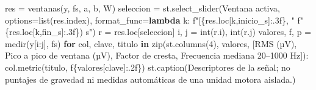\documentclass[
  spanish,
  10.5pt,
  a4paper,
  DIV=11,
  numbers=noendperiod]{scrartcl}
\newenvironment{Shaded}{\begin{snugshade}}{\end{snugshade}}
\newcommand{\BuiltInTok}[1]{\textcolor[rgb]{0.00,0.23,0.31}{#1}}
\newcommand{\ControlFlowTok}[1]{\textcolor[rgb]{0.00,0.23,0.31}{\textbf{#1}}}
\newcommand{\DecValTok}[1]{\textcolor[rgb]{0.68,0.00,0.00}{#1}}
\newcommand{\KeywordTok}[1]{\textcolor[rgb]{0.00,0.23,0.31}{\textbf{#1}}}
\newcommand{\NormalTok}[1]{\textcolor[rgb]{0.00,0.23,0.31}{#1}}
\newcommand{\OperatorTok}[1]{\textcolor[rgb]{0.37,0.37,0.37}{#1}}
\newcommand{\SpecialCharTok}[1]{\textcolor[rgb]{0.37,0.37,0.37}{#1}}
\newcommand{\SpecialStringTok}[1]{\textcolor[rgb]{0.13,0.47,0.30}{#1}}
\newcommand{\StringTok}[1]{\textcolor[rgb]{0.13,0.47,0.30}{#1}}
\begin{document}
\begin{Shaded}
\begin{Highlighting}[]
\NormalTok{res }\OperatorTok{=}\NormalTok{ ventanas(y, fs, a, b, W)}
\NormalTok{seleccion }\OperatorTok{=}\NormalTok{ st.select\_slider(}\StringTok{\textquotesingle{}Ventana activa\textquotesingle{}}\NormalTok{, options}\OperatorTok{=}\BuiltInTok{list}\NormalTok{(res.index),}
\NormalTok{    format\_func}\OperatorTok{=}\KeywordTok{lambda}\NormalTok{ k: }\SpecialStringTok{f"[}\SpecialCharTok{\{}\NormalTok{res}\SpecialCharTok{.}\NormalTok{loc[k,}\StringTok{\textquotesingle{}inicio\_s\textquotesingle{}}\NormalTok{]}\SpecialCharTok{:.3f\}}\SpecialStringTok{, "}
                         \SpecialStringTok{f"}\SpecialCharTok{\{}\NormalTok{res}\SpecialCharTok{.}\NormalTok{loc[k,}\StringTok{\textquotesingle{}fin\_s\textquotesingle{}}\NormalTok{]}\SpecialCharTok{:.3f\}}\SpecialStringTok{) s"}\NormalTok{)}
\NormalTok{r }\OperatorTok{=}\NormalTok{ res.loc[seleccion]}
\NormalTok{i, j }\OperatorTok{=} \BuiltInTok{int}\NormalTok{(r.i), }\BuiltInTok{int}\NormalTok{(r.j)}
\NormalTok{valores, f, p }\OperatorTok{=}\NormalTok{ medir(y[i:j], fs)}
\ControlFlowTok{for}\NormalTok{ col, clave, titulo }\KeywordTok{in} \BuiltInTok{zip}\NormalTok{(st.columns(}\DecValTok{4}\NormalTok{), valores,}
\NormalTok{    [}\StringTok{\textquotesingle{}RMS (µV)\textquotesingle{}}\NormalTok{, }\StringTok{\textquotesingle{}Pico a pico de ventana (µV)\textquotesingle{}}\NormalTok{,}
     \StringTok{\textquotesingle{}Factor de cresta\textquotesingle{}}\NormalTok{, }\StringTok{\textquotesingle{}Frecuencia mediana 20–1000 Hz\textquotesingle{}}\NormalTok{]):}
\NormalTok{    col.metric(titulo, }\SpecialStringTok{f\textquotesingle{}}\SpecialCharTok{\{}\NormalTok{valores[clave]}\SpecialCharTok{:.2f\}}\SpecialStringTok{\textquotesingle{}}\NormalTok{)}
\NormalTok{st.caption(}\StringTok{\textquotesingle{}Descriptores de la señal; no puntajes de gravedad ni medidas \textquotesingle{}}
           \StringTok{\textquotesingle{}automáticas de una unidad motora aislada.\textquotesingle{}}\NormalTok{)}


\end{Highlighting}
\end{Shaded}
\end{document}
